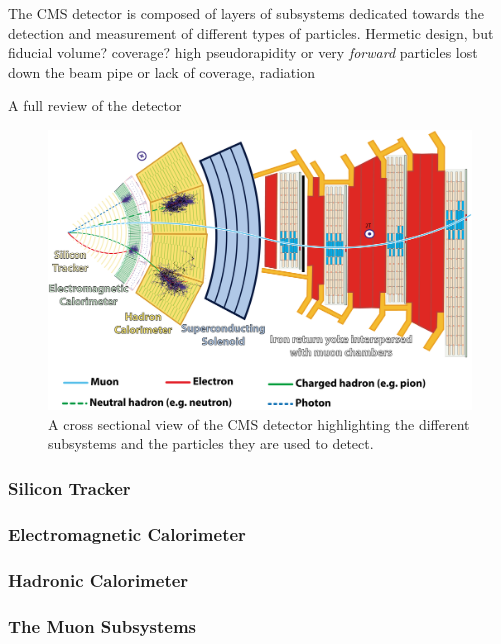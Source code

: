 The CMS detector is composed of layers of subsystems dedicated towards the detection and measurement of different types of particles. Hermetic design, but fiducial volume? coverage? high pseudorapidity or very \textit{forward} particles lost down the beam pipe or lack of coverage, radiation


A full review of the detector \cite{CMSTDR1}

\begin{figure}[htbp]
  \centering
    \includegraphics[width=5.5in]{images/CMSslice_whiteBackground}
    \caption[Cross Sectional View of the CMS Detector]{A cross sectional view of the CMS detector highlighting the different subsystems and the particles they are used to detect.\cite{CMSslice}}
    \label{fig:CMSslice}
\end{figure}

\subsubsection{Silicon Tracker}

\subsubsection{Electromagnetic Calorimeter}

\subsubsection{Hadronic Calorimeter}

\subsubsection{The Muon Subsystems}

